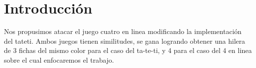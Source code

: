 \section{Introducción}

Nos propusimos atacar el juego cuatro en linea modificando la implementación del tateti.
Ambos juegos tienen similitudes, se gana logrando obtener una hilera de 3 fichas del mismo color para el caso del ta-te-ti,
y 4 para el caso del 4 en linea sobre el cual enfocaremos el trabajo.
%
%
%
%
%
%
%
%
%
%
